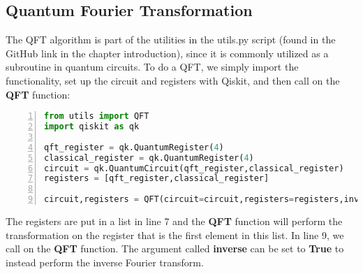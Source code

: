 \subsection{Quantum Fourier Transformation}
\label{subsec:MethodsQFT}
The QFT algorithm is part of the utilities in the utils.py script (found in the GitHub link in the chapter introduction), since it is commonly utilized as a subroutine in quantum circuits. To do a QFT, we simply import the functionality, set up the circuit and registers with Qiskit, and then call on the \textbf{QFT} function:
\begin{lstlisting}[language=Python,numbers=left]
from utils import QFT
import qiskit as qk

qft_register = qk.QuantumRegister(4)
classical_register = qk.QuantumRegister(4)
circuit = qk.QuantumCircuit(qft_register,classical_register)
registers = [qft_register,classical_register]

circuit,registers = QFT(circuit=circuit,registers=registers,inverse=False)
\end{lstlisting}
The registers are put in a list in line 7 and the \textbf{QFT} function will perform the transformation on the register that is the first element in this list.
In line 9, we call on the \textbf{QFT} function. The argument called \textbf{inverse} can be set to \textbf{True} to instead perform the inverse Fourier transform.

